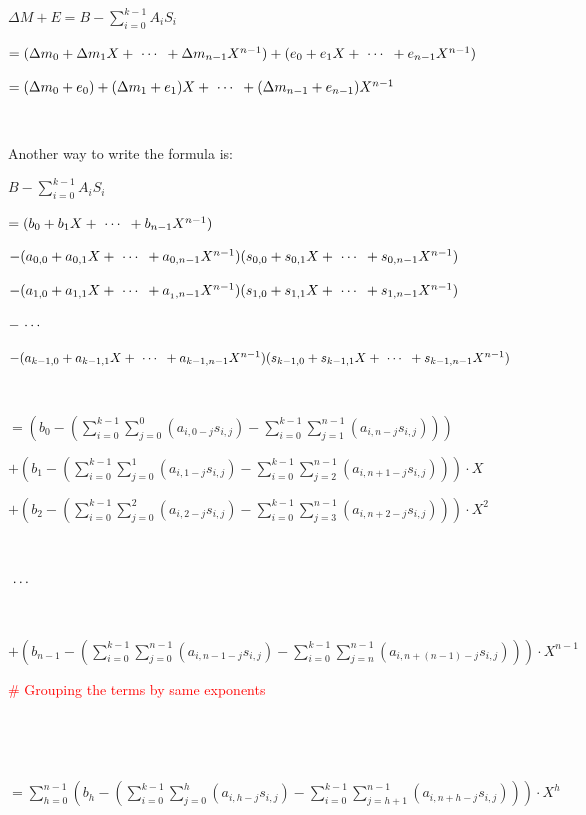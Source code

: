 $\Delta M + E = B - \sum\limits_{i=0}^{k-1}A_iS_i$ 

$ = (\Delta m_0 + \Delta m_1X + \text{ } \text{$\cdots$} \text{ } + \Delta m_{n-1}X^{n-1}) + (e_0 + e_1X + \text{ } \text{$\cdots$} \text{ } + e_{n-1}X^{n-1})$

$= (\Delta m_0 + e_0) + (\Delta m_1 + e_1)X + \text{ } \text{$\cdots$} \text{ } + (\Delta m_{n-1} + e_{n-1})X^{n-1}$

$ $

\noindent Another way to write the formula is:

$B - \sum\limits_{i=0}^{k-1}A_iS_i$ 

$ = (b_0 + b_1X + \text{ } \text{$\cdots$} \text{ } + b_{n-1}X^{n-1} )$ 

$ - (a_{0,0} + a_{0,1}X + \text{ } \text{$\cdots$} \text{ } + a_{0, n-1}X^{n-1})(s_{0,0} + s_{0,1}X + \text{ } \text{$\cdots$} \text{ } + s_{0, n-1}X^{n-1})$ 

$ - (a_{1,0} + a_{1,1}X + \text{ } \text{$\cdots$} \text{ } + a_{_1, n-1}X^{n-1})(s_{1,0} + s_{1,1}X + \text{ } \text{$\cdots$} \text{ } + s_{1, n-1}X^{n-1})$ 

$ - \text{ } \text{$\cdots$} \text{ } $ 

$ - (a_{k-1,0} + a_{k-1,1}X + \text{ } \text{$\cdots$} \text{ } + a_{k-1, n-1}X^{n-1})(s_{k-1,0} + s_{k-1,1}X + \text{ } \text{$\cdots$} \text{ } + s_{k-1, n-1}X^{n-1})$ 

$ $

$ = \left(b_0 - \left( \sum\limits_{i=0}^{k-1} \sum\limits_{j=0}^{0}(a_{i,0-j}s_{i,j}) - \sum\limits_{i=0}^{k-1} \sum\limits_{j=1}^{n-1}(a_{i,n-j}s_{i,j}) \right)\right)$

$ + \left(b_1 - \left( \sum\limits_{i=0}^{k-1} \sum\limits_{j=0}^{1}(a_{i,1-j}s_{i,j}) - \sum\limits_{i=0}^{k-1} \sum\limits_{j=2}^{n-1}(a_{i,n+1-j}s_{i,j})   \right) \right)\cdot X$ 



$ + \left(b_2 - \left( \sum\limits_{i=0}^{k-1} \sum\limits_{j=0}^{2}(a_{i,2-j}s_{i,j}) - \sum\limits_{i=0}^{k-1} \sum\limits_{j=3}^{n-1}(a_{i,n+2-j}s_{i,j})   \right) \right)\cdot X^2$ 

$ $

$\text{ } \text{$\cdots$} \text{ }$ 

$ $

$ + \left(b_{n-1} - \left(  \sum\limits_{i=0}^{k-1} \sum\limits_{j=0}^{n-1}(a_{i,n-1-j}s_{i,j}) - \sum\limits_{i=0}^{k-1} \sum\limits_{j=n}^{n-1}(a_{i,n+(n-1)-j}s_{i,j})  \right) \right)\cdot X^{n-1}$ 

\textcolor{red}{\# Grouping the terms by same exponents}

$ $


$ $

$= \sum\limits_{h=0}^{n-1}  \left(b_h - \left(  \sum\limits_{i=0}^{k-1} \sum\limits_{j=0}^{h}(a_{i,h-j}s_{i,j}) - \sum\limits_{i=0}^{k-1} \sum\limits_{j=h+1}^{n-1}(a_{i,n+h-j}s_{i,j})  \right) \right)\cdot X^{h}  $


